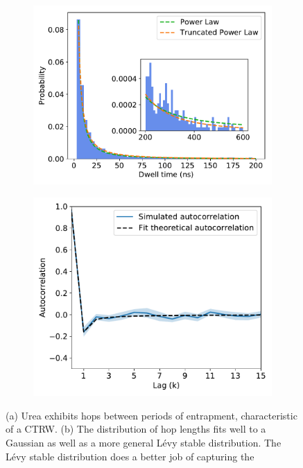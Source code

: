 \documentclass[12pt]{article}
\begin{document}
\begin{figure}
  \begin{subfigure}{0.45\textwidth}
  \includegraphics[width=\textwidth]{URE_powerlaw.pdf}
  \caption{}\label{fig:powerlaw}
  \end{subfigure}
  \begin{subfigure}{0.45\textwidth}
  \includegraphics[width=\textwidth]{URE_hop_acf.pdf}
  \caption{}\label{fig:hop_acf}
  \end{subfigure}
  \caption{(a) Urea exhibits hops between periods of entrapment, characteristic of a CTRW. 
  (b) The distribution of hop lengths fits well to a Gaussian as well as a more general L\'evy 
  stable distribution. The L\'evy stable distribution does a better job of capturing the 
}
\end{figure}
\end{document}
